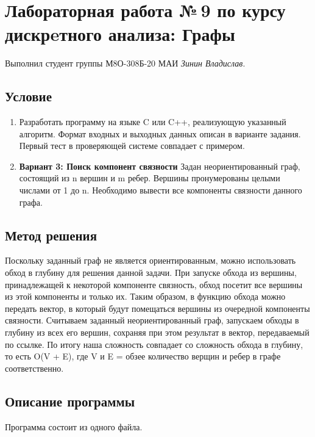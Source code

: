 \documentclass[12pt]{article}
\begin{document}
    \section*{Лабораторная работа №\,9 по курсу дискрeтного анализа: 
    Графы}

    Выполнил студент группы М8О-308Б-20 МАИ \textit{Зинин Владислав}.

    \subsection*{Условие}
 
    \begin{enumerate}
    \item Разработать программу на языке C или C++, реализующую указанный
    алгоритм. Формат входных и выходных данных описан в варианте задания.
    Первый тест в проверяющей системе совпадает с примером.
    \item \textbf{Вариант 3: Поиск компонент связности} Задан неориентированный граф, состоящий из n вершин и m ребер.
    Вершины пронумерованы целыми числами от 1 до n. Необходимо вывести все компоненты связности данного графа.
    \end{enumerate}

    \subsection*{Метод решения}

    Поскольку заданный граф не является ориентированным, можно использовать обход в глубину
    для решения данной задачи. При запуске обхода из вершины, принадлежащей к 
    некоторой компоненте связность, обход посетит все вершины из этой компоненты и только их.
    Таким образом, в функцию обхода можно передать вектор, в который будут помещаться вершины из очередной компоненты связности.
    Считываем заданный неориентированный граф, запускаем обходы в глубину из всех его вершин, сохраняя при этом результат в вектор, передаваемый по ссылке.
    По итогу наша сложность совпадает со сложность обхода в глубину, то есть O(V + E), где V и E = обзее количество верщин и ребер 
    в графе соответственно.

    \subsection*{Описание программы}

    Программа состоит из одного файла.
\end{document}
